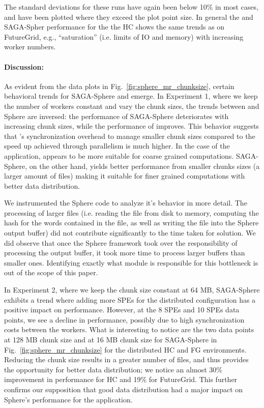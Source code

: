 \documentclass[3p,twocolumn]{elsarticle}
\begin{document}
The standard deviations for these runs have again been below 10\% in
most cases, and have been plotted where they exceed the plot point
size.  In general the \sagamapreduce and SAGA-Spher performance for
the the HC shows the same trends as on FutureGrid, e.g.,
``saturation'' (i.e. limits of IO and memory) with increasing worker
numbers.


\paragraph{Discussion:}
As evident from the data plots in Fig.~\ref{fig:sphere_mr_chunksize},
certain behavioral trends for SAGA-Sphere and \sagamapreduce emerge.
In Experiment 1, where we keep the number of workers constant and vary
the chunk sizes, the trends between \sagamapreduce and Sphere are
inversed: the performance of SAGA-Sphere deteriorates with increasing
chunk sizes, while the performance of \sagamapreduce improves. This
behavior suggests that \sagamapreduce's synchronization overhead to
manage smaller chunk sizes compared to the speed up achieved through
parallelism is much higher.  In the case of the \wc application,
\sagamapreduce appears to be more suitable for coarse grained
computations. SAGA-Sphere, on the other hand, yields better
performance from smaller chunks sizes (a larger amount of files)
making it suitable for finer grained computations with better data
distribution.

We instrumented the Sphere code to analyze it's behavior in more detail.
The processing of larger files (i.e. reading the file from disk to memory,
computing the hash for the words contained in the file, as
well as writing the file into the Sphere output buffer) did not
contribute significantly to the time taken for solution. We did
observe that once the Sphere framework took over the responsibility
of processing the output buffer, it took more time to process larger
buffers than smaller ones. Identifying exactly what module is
responsible for this bottleneck is out of the scope of this paper.

In Experiment 2, where we keep the chunk size constant at 64 MB,
SAGA-Sphere exhibits a trend where adding more SPEs for the
distributed configuration has a positive impact on
performance. However, at the 8 SPEs and 10 SPEs data points, we see a
decline in performance, possibly due to high synchronization costs
between the workers.  What is interesting to notice are the two data
points at 128 MB chunk size and at 16 MB chunk size for SAGA-Sphere in
Fig.~\ref{fig:sphere_mr_chunksize} for the distributed HC and FG
environments. Reducing the chunk size results in a greater number of
files, and thus provides the opportunity for better data distribution;
we notice an almost 30\% improvement in performance for HC and 19\%
for FutureGrid. This further confirms our supposition that good data
distribution had a major impact on Sphere's performance for the \wc
application.
\end{document}
